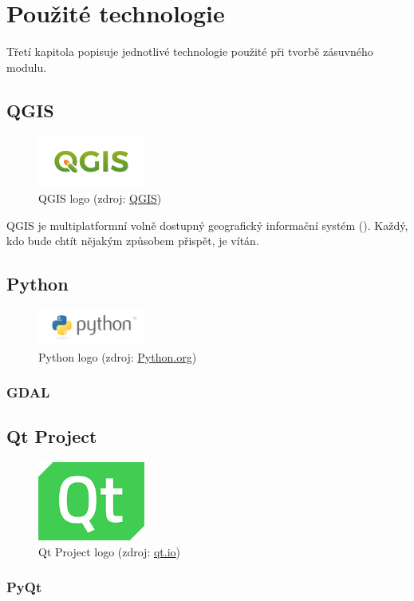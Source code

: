 \chapter{Použité technologie}
\label{3-technologie}

Třetí kapitola popisuje jednotlivé technologie použité při tvorbě zásuvného modulu.

\section{QGIS}

\begin{figure}[H]
    \centering
      \includegraphics[width=100pt]{./pictures/qgis-logo.png}
      \caption[QGIS logo]{QGIS logo 
      (zdroj: \href{https://www.qgis.org/en/_downloads/qgis-logo.png}{QGIS})}
      \label{fig:qgis}
  \end{figure}

QGIS je multiplatformní volně dostupný geografický informační systém ().
Každý, kdo bude chtít nějakým způsobem přispět, je vítán.


\section{Python}

\begin{figure}[H]
    \centering
      \includegraphics[width=100pt]{./pictures/python-logo-master-v3-TM.png}
      \caption[Python logo]{Python logo 
      (zdroj: \href{https://www.python.org/static/community_logos/python-logo-master-v3-TM.png}{Python.org})}
      \label{fig:python}
  \end{figure}
  
\subsection{GDAL}  

\section{Qt Project}

\begin{figure}[H]
    \centering
      \includegraphics[width=100pt]{./pictures/qt-logo-small.png}
      \caption[Qt Project logo]{Qt Project logo 
      (zdroj: \href{http://s3-eu-west-1.amazonaws.com/qt-files/logos/Qt-logo-small.png}{qt.io})}
      \label{fig:qt}
  \end{figure}

\subsection{PyQt}
